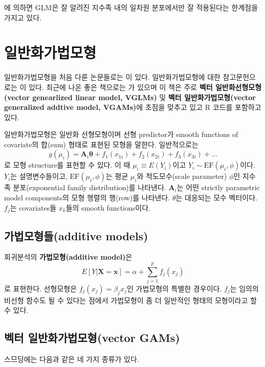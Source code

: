 \documentclass[b5paper,]{scrbook}
\theoremstyle{plain}
\theoremstyle{definition}
\numberwithin{equation}{section}
\begin{document}
\citep{Yee2015}에 의하면 GLM은 잘 알려진 지수족 내의 일차원 분포에서만 잘 적용된다는 한계점을 가지고 있다.

\hypertarget{gam}{%
\chapter{일반화가법모형}\label{gam}}

일반화가법모형을 처음 다룬 논문들로는 \citep{Hastie1986}이 있다. 일반화가법모형에 대한 참고문헌으로는 \citep{Wood2006}이 있다. 최근에 나온 좋은 책으로는 \citep{Yee2015}가 있으며 이 책은 주로 \textbf{벡터 일반화선형모형(vector genearlized linear model, VGLMs)} 및 \textbf{벡터 일반화가법모형(vector generalized addtive model, VGAMs)}에 초점을 맞추고 있고 R 코드를 포함하고 있다.

일반화가법모형은 일반화 선형모형이며 선형 predictor가 smooth functions of covariate의 합(sum) 형태로 표현된 모형을 말한다. 일반적으로는
\[g(\mu_{i})=\mathbf{A}_{i}\boldsymbol{\theta}+f_{1}(x_{1i})+f_{2}(x_{2i})+f_{3}(x_{3i})+\ldots\]
로 모형 structure를 표현할 수 있다. 이 때 \(\mu_{i}\equiv E(Y_{i})\)이고 \(Y_{i}\sim \text{EF}(\mu_{i},\phi)\)이다. \(Y_{i}\)는 설명변수들이고, \(\text{EF}(\mu_{i},\phi)\)는 평균 \(\mu_{i}\)와 척도모수(scale parameter) \(\phi\)인 지수족 분포(exponential family distribution)를 나타낸다. \(\mathbf{A}_{i}\)는 어떤 strictly parametric model components의 모형 행렬의 행(row)를 나타낸다. \(\theta\)는 대응되는 모수 벡터이다. \(f_{j}\)는 covariates들 \(x_{k}\)들의 smooth functions이다.

\hypertarget{additive-models}{%
\section{가법모형들(additive models)}\label{additive-models}}

회귀분석의 \textbf{가법모형(additive model)}은
\[E[Y|\mathbf{X}=\mathbf{x}]=\alpha+\sum_{j=1}^{p}f_{j}(x_j)\]
로 표현한다. 선형모형은 \(f_{j}(x_{j})=\beta_{j}x_{j}\)인 가법모형의 특별한 경우이다. \(f_{j}\)는 임의의 비선형 함수도 될 수 있다는 점에서 가법모형이 좀 더 일반적인 형태의 모형이라고 할 수 있다.

\hypertarget{-vector-gams}{%
\section{벡터 일반화가법모형(vector GAMs)}\label{-vector-gams}}

스므딩에는 다음과 같은 네 가지 종류가 있다.
\end{document}
